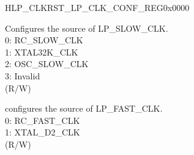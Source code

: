 \begin{register}{H}{LP\_CLKRST\_LP\_CLK\_CONF\_REG}{0x0000}\label{regdesc:LPCLKRSTLPCLKCONFREG}
%
%
%
\regnewline%
\begin{regdesc}\begin{reglist}
\label{fielddesc:LPCLKRSTSLOWCLKSEL}\item [LP\_CLKRST\_SLOW\_CLK\_SEL] Configures the source of LP\_SLOW\_CLK.\\
0: RC\_SLOW\_CLK \\
1: XTAL32K\_CLK \\
2: OSC\_SLOW\_CLK \\
3: Invalid  \\ (R/W)
\label{fielddesc:LPCLKRSTFASTCLKSEL}\item [LP\_CLKRST\_FAST\_CLK\_SEL] configures the source of LP\_FAST\_CLK.\\
0: RC\_FAST\_CLK \\
1: XTAL\_D2\_CLK  \\ (R/W)
\end{reglist}\end{regdesc}
\end{register}


